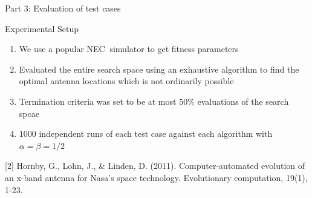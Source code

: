 \documentclass{beamer}
\begin{document}
\begin{frame}{\null}
    \begin{tcolorbox}[colback=green!5]
        \centering\Huge
        Part 3: Evaluation of test cases
    \end{tcolorbox}
\end{frame}

\begin{frame}{Experimental Setup}
\begin{enumerate}\itemsep1.2em
        \item We use a popular NEC\footnotemark $~$ simulator to get fitness parameters 
        \item Evaluated the entire search space using an exhaustive algorithm to find the optimal antenna locations which is not ordinarily possible
        \item Termination criteria was set to be at most $50\%$ evaluations of the search spcae
        \item $1000$ independent runs of each test case against each algorithm with $\alpha = \beta = 1/2$
    \end{enumerate}
    \vspace*{0.5cm}
    {\tiny [2] Hornby, G., Lohn, J., \& Linden, D. (2011). Computer-automated evolution of an x-band antenna for Nasa's space technology. Evolutionary computation, 19(1), 1-23. }
     
    
    \vspace{10mm}
\end{frame}
\end{document}

